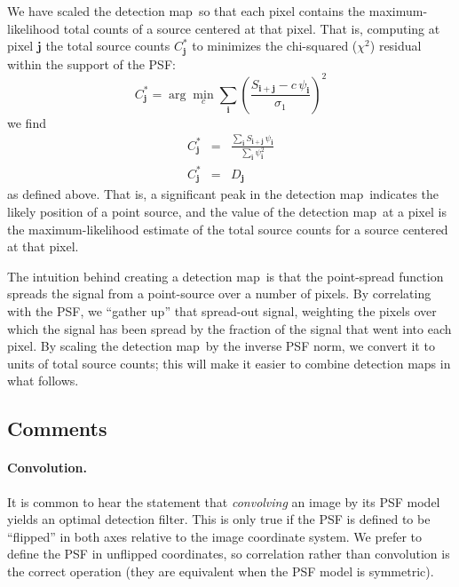 \documentclass[letterpaper,preprint]{aastex}
\newcommand{\detmap}{detection map}
\newcommand{\snr}[1]{\mathbb{SN}(#1)}
\newcommand{\norm}[1]{\left\lVert #1 \right\rVert}
\renewcommand{\vec}[1]{\boldsymbol{#1}}
\newcommand{\ivec}{\vec{i}}
\newcommand{\jvec}{\vec{j}}
\newcommand{\kvec}{\vec{k}}
\begin{document}
We have scaled the \detmap\ so that each pixel contains the
maximum-likelihood total counts of a source centered at that pixel.
That is, computing at pixel $\jvec$ the total source counts
$C^{\ast}_{\jvec}$ to minimizes the chi-squared ($\chi^2$) residual
within the support of the PSF:
\begin{equation}
  C^{\ast}_{\jvec} = \arg\min_{c} \sum_{\ivec} \left( \frac{S_{\ivec+\jvec} - c \, \psi_{\ivec}}{\sigma_1} \right)^2
\end{equation}
we find
\begin{eqnarray}
  C^{\ast}_{\jvec} &=& \frac{\sum_{\ivec} S_{\ivec+\jvec} \, \psi_{\ivec}}{\sum_{\ivec} \psi_{\ivec}^2}
  \\
  C^{\ast}_{\jvec} &=& D_{\jvec} %
\end{eqnarray}
as defined above.
%
That is, a significant peak in the \detmap\ indicates the likely
position of a point source, and the value of the \detmap\ at a pixel
is the maximum-likelihood estimate of the total source counts for a
source centered at that pixel.


The intuition behind creating a \detmap\ is that the point-spread
function spreads the signal from a point-source over a number of
pixels.  By correlating with the PSF, we ``gather up'' that spread-out
signal, weighting the pixels over which the signal has been spread by
the fraction of the signal that went into each pixel.  By scaling the
\detmap\ by the inverse PSF norm, we convert it to units of total
source counts; this will make it easier to combine \detmap s in what
follows.



\subsection{Comments}

\paragraph{Convolution.}  It is common to hear the statement
that \emph{convolving} an image by its PSF model yields an optimal
detection filter.  This is only true if the PSF is defined to be
``flipped'' in both axes relative to the image coordinate system.  We
prefer to define the PSF in unflipped coordinates, so correlation
rather than convolution is the correct operation (they are equivalent
when the PSF model is symmetric).
\end{document}
